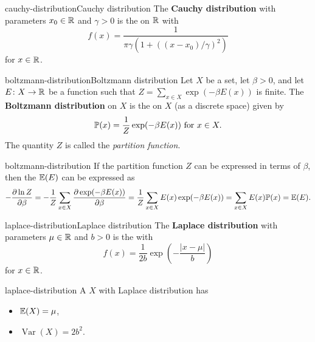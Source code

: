 \begin{topic}{cauchy-distribution}{Cauchy distribution}
    The \textbf{Cauchy distribution} with parameters $x_0 \in \mathbb{R}$ and $\gamma > 0$ is the  on $\mathbb{R}$ with 
    \[ f(x) = \frac{1}{\pi \gamma (1 + ((x - x_0) / \gamma)^2)} \]
    for $x \in \mathbb{R}$.
\end{topic}

    

\begin{topic}{boltzmann-distribution}{Boltzmann distribution}
    Let $X$ be a set, let $\beta > 0$, and let $E \colon X \to \mathbb{R}$ be a function such that $Z = \sum_{x \in X} \exp(- \beta E(x))$ is finite. The \textbf{Boltzmann distribution} on $X$ is the  on $X$ (as a discrete space) given by
    \[ \mathbb{P}(x) = \frac{1}{Z} \exp(- \beta E(x)) \textup{ for } x \in X . \]
    The quantity $Z$ is called the \textit{partition function}.
\end{topic}

\begin{example}{boltzmann-distribution}
    If the partition function $Z$ can be expressed in terms of $\beta$, then the  $\mathbb{E}(E)$ can be expressed as
    \[ - \frac{\partial \ln Z}{\partial \beta} = - \frac{1}{Z} \sum_{x \in X} \frac{\partial \exp(- \beta E(x))}{\partial \beta} = \frac{1}{Z} \sum_{x \in X} E(x) \exp(- \beta E(x)) = \sum_{x \in X} E(x) \mathbb{P}(x) = \mathbb{E}(E) . \]
\end{example}

\begin{topic}{laplace-distribution}{Laplace distribution}
    The \textbf{Laplace distribution} with parameters $\mu \in \mathbb{R}$ and $b > 0$ is the  with 
    \[ f(x) = \frac{1}{2b} \exp \left( - \frac{|x - \mu|}{b} \right) \]
    for $x \in \mathbb{R}$.
\end{topic}

\begin{example}{laplace-distribution}
    A  $X$ with Laplace distribution has
    \begin{itemize}
        \item {} $\mathbb{E}(X) = \mu$,
        \item {} $\operatorname{Var}(X) = 2 b^2$.
    \end{itemize}
\end{example}
